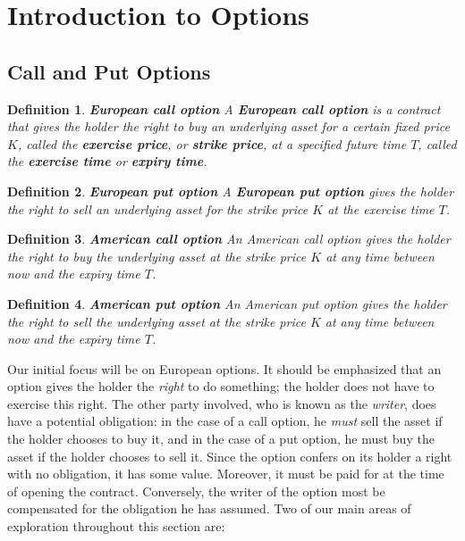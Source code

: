 \documentclass[letterpaper,10pt]{article}
\newtheorem{df}{Definition}[section]
\begin{document}
\section{Introduction to Options}

\subsection{Call and Put Options}

\begin{df}{\bf European call option}
A {\bf European call option} is a contract that gives the holder the {\em right to buy} an {\em underlying asset} for a certain fixed price $K$, called the {\bf exercise price}, or {\bf strike price}, at a specified future time $T$, called the {\bf exercise time} or {\bf expiry time}. 
\end{df}

\begin{df}{\bf European put option}
A {\bf European put option} gives the holder the {\em right to sell} an underlying asset for the strike price $K$ at the exercise time $T$.
\end{df}

\begin{df}{\bf American call option}
An American call option gives the holder the right to buy the underlying asset at the strike price $K$ at any time {\em between} now and the expiry time $T$.
\end{df}

\begin{df}{\bf American put option}
An American put option gives the holder the right to sell the underlying asset at the strike price $K$ at any time {\em between} now and the expiry time $T$.
\end{df}

\noindent Our initial focus will be on European options.  It should be emphasized that an option gives the holder the {\em right} to do something; the holder does not have to exercise this right.  The other party involved, who is known as the {\em writer}, does have a potential obligation:  in the case of a call option, he {\em must} sell the asset if the holder chooses to buy it, and in the case of a put option, he must buy the asset if the holder chooses to sell it.  Since the option confers on its holder a right with no obligation, it has some value.  Moreover, it must be paid for at the time of opening the contract.  Conversely, the writer of the option most be compensated for the obligation he has assumed.  Two of our main areas of exploration throughout this section are:
\end{document}
